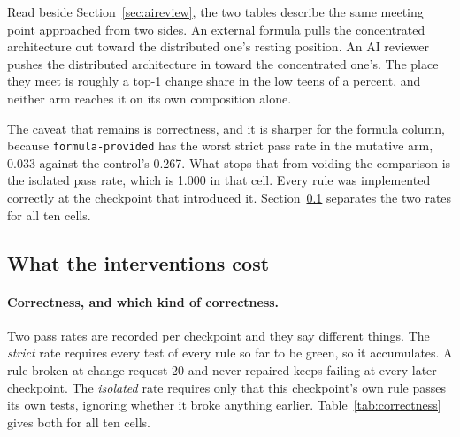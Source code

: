 \documentclass[11pt,a4paper]{article}
\begin{document}
Read beside Section~\ref{sec:aireview}, the two tables describe the same meeting
point approached from two sides. An external formula pulls the concentrated
architecture out toward the distributed one's resting position. An AI reviewer
pushes the distributed architecture in toward the concentrated one's. The place
they meet is roughly a top-1 change share in the low teens of a percent, and
neither arm reaches it on its own composition alone.

The caveat that remains is correctness, and it is sharper for the formula column,
because \texttt{formula-provided} has the worst strict pass rate in the mutative
arm, 0.033 against the control's 0.267. What stops that from voiding the
comparison is the isolated pass rate, which is 1.000 in that cell. Every rule was
implemented correctly at the checkpoint that introduced it.
Section~\ref{sec:correctness} separates the two rates for all ten cells.

\subsection{What the interventions cost}
\label{sec:correctness}

\paragraph{Correctness, and which kind of correctness.} Two pass rates are
recorded per checkpoint and they say different things.
The \emph{strict} rate requires every test of every rule so far to be green, so
it accumulates. A rule broken at change request 20 and never repaired keeps
failing at every later checkpoint. The \emph{isolated} rate requires only that
this checkpoint's own rule passes its own tests, ignoring whether it broke
anything earlier. Table~\ref{tab:correctness} gives both for all ten cells.
\end{document}
